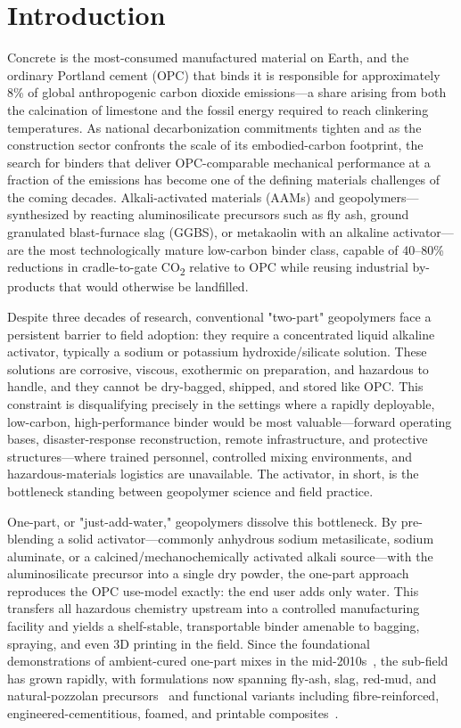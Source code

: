 \documentclass[materials,article,submit,pdftex,moreauthors]{Definitions/mdpi}
\begin{document}
\section{Introduction}
Concrete is the most-consumed manufactured material on Earth, and the ordinary Portland cement (OPC) that binds it is responsible for approximately 8\% of global anthropogenic carbon dioxide emissions---a share arising from both the calcination of limestone and the fossil energy required to reach clinkering temperatures. As national decarbonization commitments tighten and as the construction sector confronts the scale of its embodied-carbon footprint, the search for binders that deliver OPC-comparable mechanical performance at a fraction of the emissions has become one of the defining materials challenges of the coming decades. Alkali-activated materials (AAMs) and geopolymers---synthesized by reacting aluminosilicate precursors such as fly ash, ground granulated blast-furnace slag (GGBS), or metakaolin with an alkaline activator---are the most technologically mature low-carbon binder class, capable of 40--80\% reductions in cradle-to-gate CO\textsubscript{2} relative to OPC while reusing industrial by-products that would otherwise be landfilled.

Despite three decades of research, conventional "two-part" geopolymers face a persistent barrier to field adoption: they require a concentrated liquid alkaline activator, typically a sodium or potassium hydroxide/silicate solution. These solutions are corrosive, viscous, exothermic on preparation, and hazardous to handle, and they cannot be dry-bagged, shipped, and stored like OPC. This constraint is disqualifying precisely in the settings where a rapidly deployable, low-carbon, high-performance binder would be most valuable---forward operating bases, disaster-response reconstruction, remote infrastructure, and protective structures---where trained personnel, controlled mixing environments, and hazardous-materials logistics are unavailable. The activator, in short, is the bottleneck standing between geopolymer science and field practice.

One-part, or "just-add-water," geopolymers dissolve this bottleneck. By pre-blending a solid activator---commonly anhydrous sodium metasilicate, sodium aluminate, or a calcined/mechanochemically activated alkali source---with the aluminosilicate precursor into a single dry powder, the one-part approach reproduces the OPC use-model exactly: the end user adds only water. This transfers all hazardous chemistry upstream into a controlled manufacturing facility and yields a shelf-stable, transportable binder amenable to bagging, spraying, and even 3D printing in the field. Since the foundational demonstrations of ambient-cured one-part mixes in the mid-2010s~\cite{ref13,ref23}, the sub-field has grown rapidly, with formulations now spanning fly-ash, slag, red-mud, and natural-pozzolan precursors~\cite{ref14,ref15} and functional variants including fibre-reinforced, engineered-cementitious, foamed, and printable composites~\cite{ref19,ref21,ref22}.
\end{document}
